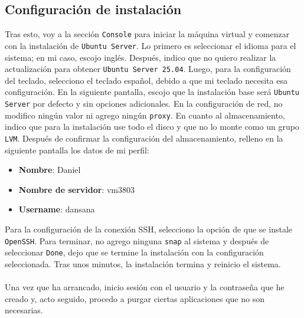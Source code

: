\documentclass[10pt]{article}
\begin{document}
	\subsection{Configuración de instalación}
	Tras esto, voy a la sección \verb|Console| para iniciar la máquina virtual y comenzar con la instalación de \verb|Ubuntu Server|. Lo primero es seleccionar el idioma para el sistema; en mi caso, escojo inglés. Después, indico que no quiero realizar la actualización para obtener \verb|Ubuntu Server 25.04|. Luego, para la configuración del teclado, selecciono el teclado español, debido a que mi teclado necesita esa configuración. En la siguiente pantalla, escojo que la instalación base será \verb|Ubuntu Server| por defecto y sin opciones adicionales. En la configuración de red, no modifico ningún valor ni agrego ningún \verb|proxy|. En cuanto al almacenamiento, indico que para la instalación use todo el disco y que no lo monte como un grupo \verb|LVM|. Después de confirmar la configuración del almacenamiento, relleno en la siguiente pantalla los datos de mi perfil:
	\begin{itemize}
		\item \textbf{Nombre}: Daniel
		\item \textbf{Nombre de servidor}: vm3803
		\item \textbf{Username}: dansana
	\end{itemize}
	Para la configuración de la conexión SSH, selecciono la opción de que se instale \verb|OpenSSH|. Para terminar, no agrego ninguna \verb|snap| al sistema y después de seleccionar \verb|Done|, dejo que se termine la instalación con la configuración seleccionada. Tras unos minutos, la instalación termina y reinicio el sistema.\\\\
	Una vez que ha arrancado, inicio sesión con el usuario y la contraseña que he creado y, acto seguido, procedo a purgar ciertas aplicaciones que no son necesarias.
	
\end{document}
